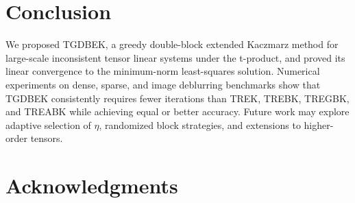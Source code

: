 \documentclass[11pt]{article}
\begin{document}
\section{Conclusion}\label{sec:concl}
We proposed TGDBEK, a greedy double-block extended Kaczmarz method for large-scale inconsistent tensor linear systems under the t-product, and proved its linear convergence to the minimum-norm least-squares solution. Numerical experiments on dense, sparse, and image deblurring benchmarks show that TGDBEK consistently requires fewer iterations than TREK, TREBK, TREGBK, and TREABK while achieving equal or better accuracy. Future work may explore adaptive selection of $\eta$, randomized block strategies, and extensions to higher-order tensors.
 


\section*{Acknowledgments}
\end{document}
